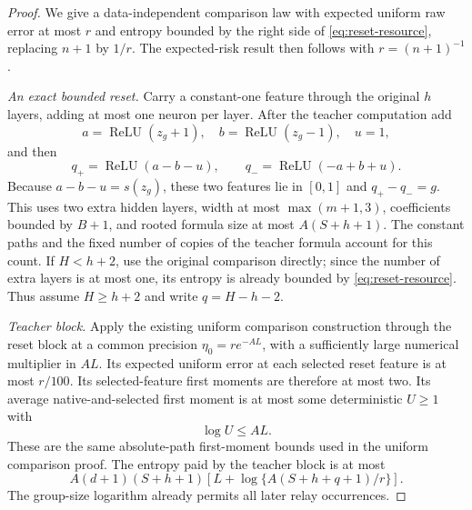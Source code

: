 \begin{proof}
We give a data-independent comparison law with expected uniform raw
error at most $r$ and entropy bounded by the right side of
\eqref{eq:reset-resource}, replacing $n+1$ by $1/r$.
The expected-risk result then follows with $r=(n+1)^{-1}$.

\emph{An exact bounded reset.}
Carry a constant-one feature through the original $h$ layers, adding
at most one neuron per layer. After the teacher computation add
\[
 a=\operatorname{ReLU}(z_g+1),\quad
 b=\operatorname{ReLU}(z_g-1),\quad u=1,
\]
and then
\[
 q_+=\operatorname{ReLU}(a-b-u),\qquad
 q_-=\operatorname{ReLU}(-a+b+u).
\]
Because $a-b-u=s(z_g)$, these two features lie in $[0,1]$ and
$q_+-q_-=g$. This uses two extra hidden layers, width at most
$\max(m+1,3)$, coefficients bounded by $B+1$, and rooted formula
size at most $A(S+h+1)$. The constant paths and the fixed number of
copies of the teacher formula account for this count.
If $H<h+2$, use the original comparison directly; since the number
of extra layers is at most one, its entropy is already bounded by
\eqref{eq:reset-resource}. Thus assume $H\ge h+2$ and write
$q=H-h-2$.

\emph{Teacher block.}
Apply the existing uniform comparison construction through the reset
block at a common precision $\eta_0=r e^{-A L}$, with a sufficiently
large numerical multiplier in $A L$. Its expected uniform error at
each selected reset feature is at most $r/100$. Its selected-feature
first moments are therefore at most two. Its average native-and-selected
first moment is at most some deterministic $U\ge1$ with
\begin{equation}
 \log U\le A L.
 \label{eq:reset-bulk-envelope}
\end{equation}
These are the same absolute-path first-moment bounds used in the
uniform comparison proof. The entropy paid by the teacher block is
at most
\[
 A(d+1)(S+h+1)
       [L+\log\{A(S+h+q+1)/r\}].
\]
The group-size logarithm already permits all later relay occurrences.


\end{proof}
